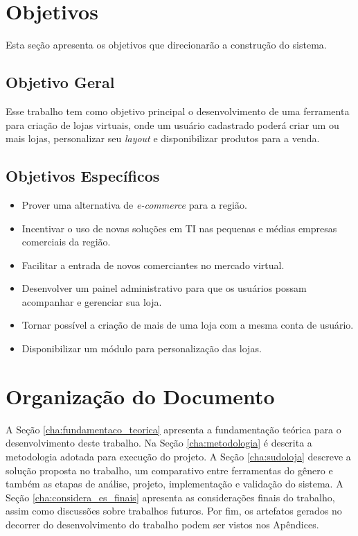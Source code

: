 \documentclass[a4paper,12pt]{monografia}
\begin{document}

\section{Objetivos} %
\label{sec:objetivos}

Esta seção apresenta os objetivos que direcionarão a construção do sistema.

\subsection{Objetivo Geral} %
\label{sub:objetivo_geral}

Esse trabalho tem como objetivo principal o desenvolvimento de uma ferramenta para criação de lojas virtuais, onde um usuário cadastrado poderá criar um ou mais lojas, personalizar seu \textit{layout} e disponibilizar produtos para a venda.


\subsection{Objetivos Específicos} %
\label{sub:objetivos_espec}

\begin{itemize}
\item Prover uma alternativa de \textit{e-commerce} para a região.
\item Incentivar o uso de novas soluções em TI nas pequenas e médias empresas comerciais da região.
\item Facilitar a entrada de novos comerciantes no mercado virtual.
\item Desenvolver um painel administrativo para que os usuários possam acompanhar e gerenciar sua loja.
\item Tornar possível a criação de mais de uma loja com a mesma conta de usuário.
\item Disponibilizar um módulo para personalização das lojas.
\end{itemize}


\section{Organização do Documento} %
\label{sec:organizacao_do_documento}

A Seção \ref{cha:fundamentaco_teorica} apresenta a fundamentação teórica para o desenvolvimento deste trabalho. Na Seção \ref{cha:metodologia} é descrita a metodologia adotada para execução do projeto. A Seção \ref{cha:sudoloja} descreve a solução proposta no trabalho, um comparativo entre ferramentas do gênero e também as etapas de análise, projeto, implementação e validação do sistema. A Seção \ref{cha:considera_es_finais} apresenta as considerações finais do trabalho, assim como discussões sobre trabalhos futuros. Por fim, os artefatos gerados no decorrer do desenvolvimento do trabalho podem ser vistos nos Apêndices.
\end{document}
